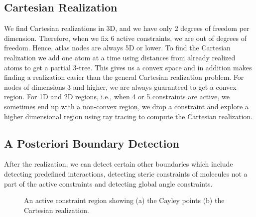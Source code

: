 \subsection{Cartesian Realization}
We find Cartesian realizations in 3D, and we have only
2 degrees of freedom per dimension. Therefore, when we fix 6 active constraints,
we are out of degrees of freedom. Hence, atlas nodes are always 5D or lower.
To find the Cartesian realization we add one atom at a time using distances
from already realized atoms to get a partial 3-tree. This gives us a convex
space and in addition makes finding a realization easier than the general
Cartesian realization problem. For nodes of dimensions 3 and higher, we are
always guaranteed to get a convex region. For 1D and 2D regions, i.e., when 4 or
5 constraints are active, we sometimes end up with a non-convex region, we drop
a constraint and explore a higher dimensional region using ray tracing to
compute the Cartesian realization.


\subsection{A Posteriori Boundary Detection}
After the realization, we can detect certain other boundaries which include
detecting predefined interactions, detecting steric constraints of molecules
not a part of the active constraints and detecting global angle constraints.

\begin{figure}
\linewidth
{}
\label{ImprovedChildSampling}
\caption{An active constraint region showing (a) the Cayley points (b) the Cartesian realization.}
\end{figure}

